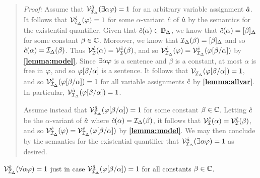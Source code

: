 \begin{quote} 
  \textit{Proof:}
  Assume that $\mathcal{V}_{\mathcal{I}_\Delta}^{\hat{a}}(\exists \alpha\varphi)=1$ for an arbitrary variable assignment $\hat{a}$.
  It follows that $\mathcal{V}_{\mathcal{I}_\Delta}^{\hat{c}}(\varphi)=1$ for some $\alpha$-variant $\hat{c}$ of $\hat{a}$ by the semantics for the existential quantifier.
  Given that $\hat{c}(\alpha)\in\mathbb{D}_\Delta$, we know that $\hat{c}(\alpha)=[\beta]_\Delta$ for some constant $\beta\in\mathbb{C}$.
  Moreover, we know that $\mathcal{I}_\Delta(\beta)=[\beta]_\Delta$ and so $\hat{c}(\alpha)=\mathcal{I}_\Delta(\beta)$.
  Thus $\mathcal{V}_{\mathcal{I}}^{\hat{c}}(\alpha)=\mathcal{V}_{\mathcal{I}}^{\hat{c}}(\beta)$, and so $\mathcal{V}_{\mathcal{I}_\Delta}^{\hat{c}}(\varphi)=\mathcal{V}_{\mathcal{I}_\Delta}^{\hat{c}}(\varphi[\beta/\alpha])$ by \textbf{\ref{lemma:model}}.
  Since $\exists \alpha\varphi$ is a sentence and $\beta$ is a constant, at most $\alpha$ is free in $\varphi$, and so $\varphi[\beta/\alpha]$ is a sentence.
  It follows that $\mathcal{V}_{\mathcal{I}_\Delta}^{}(\varphi[\beta/\alpha])=1$, and so $\mathcal{V}_{\mathcal{I}_\Delta}^{\hat{e}}(\varphi[\beta/\alpha])=1$ for all variable assignments $\hat{e}$ by \textbf{\ref{lemma:allvar}}.
  In particular, $\mathcal{V}_{\mathcal{I}_\Delta}^{\hat{a}}(\varphi[\beta/\alpha])=1$.

  Assume instead that $\mathcal{V}_{\mathcal{I}_\Delta}^{\hat{a}}(\varphi[\beta/\alpha])=1$ for some constant $\beta\in\mathbb{C}$.
  Letting $\hat{c}$ be the $\alpha$-variant of $\hat{a}$ where $\hat{c}(\alpha)=\mathcal{I}_\Delta(\beta)$, it follows that $\mathcal{V}_{\mathcal{I}}^{\hat{c}}(\alpha)=\mathcal{V}_{\mathcal{I}}^{\hat{c}}(\beta)$, and so $\mathcal{V}_{\mathcal{I}_\Delta}^{\hat{c}}(\varphi)=\mathcal{V}_{\mathcal{I}_\Delta}^{\hat{c}}(\varphi[\beta/\alpha])$ by \textbf{\ref{lemma:model}}.
  We may then conclude by the semantics for the existential quantifier that $\mathcal{V}_{\mathcal{I}_\Delta}^{\hat{a}}(\exists \alpha\varphi)=1$ as desired. 
\end{quote}






\begin{Lthm} \label{lemma:quantA}
  $\mathcal{V}_{\mathcal{I}_\Delta}^{\hat{a}}(\forall \alpha\varphi)=1$ just in case $\mathcal{V}_{\mathcal{I}_\Delta}^{\hat{a}}(\varphi[\beta/\alpha])=1$ for all constants $\beta\in\mathbb{C}$.
\end{Lthm}

